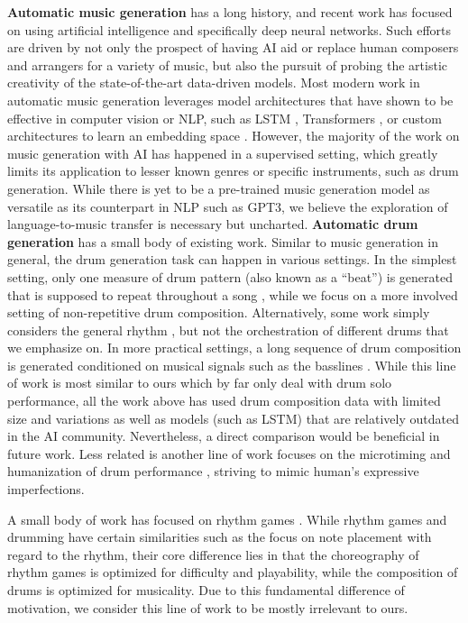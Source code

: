 \documentclass[letterpaper]{article} %
\begin{document}
\textbf{Automatic music generation} has a long history, and recent work has focused on using artificial intelligence \cite{kaliakatsos2020artificial} and specifically deep neural networks. Such efforts are driven by not only the prospect of having AI aid or replace human composers and arrangers for a variety of music, but also the pursuit of probing the artistic creativity of the state-of-the-art data-driven models. Most modern work in automatic music generation leverages model architectures that have shown to be effective in computer vision or NLP, such as LSTM \cite{lyu2015modelling}, Transformers \citep{huang2018music,zeng2021musicbert,https://doi.org/10.48550/arxiv.2210.10349}, or custom architectures to learn an embedding space \cite{liang2020pirhdy}. However, the majority of the work on music generation with AI has happened in a supervised setting, which greatly limits its application to lesser known genres or specific instruments, such as drum generation. While there is yet to be a pre-trained music generation model as versatile as its counterpart in NLP such as GPT3, we believe the exploration of language-to-music transfer is necessary but uncharted.  \textbf{Automatic drum generation} has a small body of existing work. Similar to music generation in general, the drum generation task can happen in various settings. In the simplest setting, only one measure of drum pattern (also known as a ``beat'') is generated that is supposed to repeat throughout a song  \cite{vogl2017intelligent,bruford2020jaki,complexis21}, while we focus on a more involved setting of non-repetitive drum composition. Alternatively, some work simply considers the general rhythm \cite{lattner2019high}, but not the orchestration of different drums that we emphasize on. In more practical settings, a long sequence of drum composition is generated conditioned on musical signals such as the basslines \cite{makris2017combining,makris2019conditional}. While this line of work is most similar to ours which by far only deal with drum solo performance, all the work above has used drum composition data with limited size and variations as well as models (such as LSTM) that are relatively outdated in the AI community. Nevertheless, a direct comparison would be beneficial in future work. Less related is another line of work focuses on the microtiming and humanization of drum performance \cite{gillick2019learning,burloiu2020adaptive,burloiu2020interactive}, striving to mimic human's expressive imperfections.

A small body of work has focused on rhythm games \cite{donahue2017dance,liang2019procedural}. While rhythm games and drumming have certain similarities such as the focus on note placement with regard to the rhythm, their core difference lies in that the choreography of rhythm games is optimized for difficulty and playability, while the composition of drums is optimized for musicality. Due to this fundamental difference of motivation, we consider this line of work to be mostly irrelevant to ours.
\end{document}
